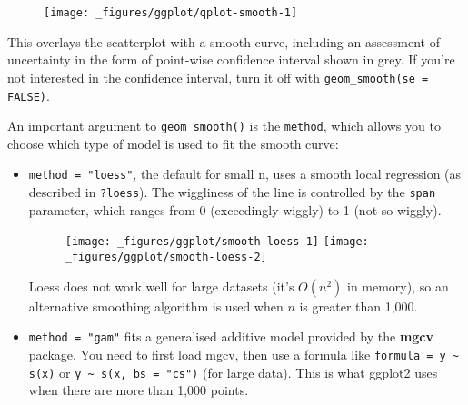 \begin{figure}[H]
  \centering
  \texttt{[image: \_figures/ggplot/qplot-smooth-1]}
\end{figure}

This overlays the scatterplot with a smooth curve, including an
assessment of uncertainty in the form of point-wise confidence interval
shown in grey. If you're not interested in the confidence interval, turn
it off with \texttt{geom\_smooth(se = FALSE)}.

An important argument to \texttt{geom\_smooth()} is the \texttt{method},
which allows you to choose which type of model is used to fit the smooth
curve:

\begin{itemize}
\item
  \texttt{method = "loess"}, the default for small n, uses a smooth
  local regression (as described in \texttt{?loess}). The wiggliness of
  the line is controlled by the \texttt{span} parameter, which ranges
  from 0 (exceedingly wiggly) to 1 (not so wiggly).

\begin{Shaded}
\begin{Highlighting}[]
\StringTok{ }
\StringTok{  }\NormalTok{() +}\StringTok{ }
\StringTok{  }\NormalTok{(} \NormalTok{)}

\StringTok{ }
\StringTok{  }\NormalTok{() +}\StringTok{ }
\StringTok{  }\NormalTok{(} \NormalTok{)}
\end{Highlighting}
\end{Shaded}

  \begin{figure}[H]
    \texttt{[image: \_figures/ggplot/smooth-loess-1]}%
    \texttt{[image: \_figures/ggplot/smooth-loess-2]}
  \end{figure}

  Loess does not work well for large datasets (it's \(O(n^2)\) in
  memory), so an alternative smoothing algorithm is used when \(n\) is
  greater than 1,000.
\item
  \texttt{method = "gam"} fits a generalised additive model provided by
  the \textbf{mgcv} package. You need to first load mgcv, then use a
  formula like \texttt{formula = y \textasciitilde{} s(x)} or
  \texttt{y \textasciitilde{} s(x, bs = "cs")} (for large data). This is
  what ggplot2 uses when there are more than 1,000 points. 


\end{itemize}
